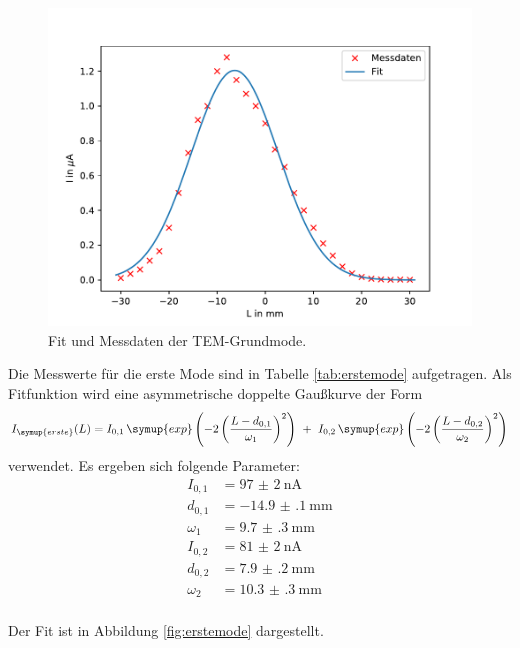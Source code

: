 \begin{figure}[H]
  \centering
  \includegraphics{grundmode.pdf}
  \caption{Fit und Messdaten der TEM-Grundmode.}
  \label{fig:grundmode}
\end{figure}

Die Messwerte für die erste Mode sind in Tabelle \ref{tab:erstemode} aufgetragen.
Als Fitfunktion wird eine asymmetrische doppelte Gaußkurve der Form
\begin{align}
  I_{\symup{erste}}(L) =
  I_{0,1}\,\symup{exp}\left(-2\left(\frac{L-d_{0,1}}{\omega_1}\right)^2\right)\,\,+\,\,I_{0,2}\,
  \symup{exp}\left(-2\left(\frac{
  L-d_{0,2}}{\omega_2}\right)^2\right)
\end{align}
verwendet.
Es ergeben sich folgende Parameter:
\begin{align}
  I_{0,1} &= \SI{97(2)}{\nano\ampere}\\
  d_{0,1} &= \SI{-14.9(1)}{\milli\meter}\\
  \omega_1 &= \SI{9.7(3)}{\milli\meter}\\
  I_{0,2} &= \SI{81(2)}{\nano\ampere}\\
  d_{0,2} &= \SI{7.9(2)}{\milli\meter}\\
  \omega_2 &= \SI{10.3(3)}{\milli\meter}\\
\end{align}

Der Fit ist in Abbildung \ref{fig:erstemode} dargestellt.


